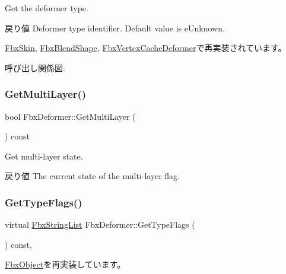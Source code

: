 Get the deformer type. \begin{DoxyReturn}{戻り値}
Deformer type identifier. Default value is e\+Unknown. 
\end{DoxyReturn}


\hyperlink{class_fbx_skin_abaf5fca14c0e8339ea692560fbd494d8}{Fbx\+Skin}, \hyperlink{class_fbx_blend_shape_afc886286ac95264b993335d8b3954b4f}{Fbx\+Blend\+Shape}, \hyperlink{class_fbx_vertex_cache_deformer_ab213400e170fe58699649acaf652c787}{Fbx\+Vertex\+Cache\+Deformer}で再実装されています。

呼び出し関係図\+:
\mbox{\label{class_fbx_deformer_a1f56fdb78d3b615bb2b4b4d142436e8b}} 
\subsubsection{\texorpdfstring{Get\+Multi\+Layer()}{GetMultiLayer()}}
{\footnotesize\ttfamily bool Fbx\+Deformer\+::\+Get\+Multi\+Layer (\begin{DoxyParamCaption}{ }\end{DoxyParamCaption}) const}

Get multi-\/layer state. \begin{DoxyReturn}{戻り値}
The current state of the multi-\/layer flag. 
\end{DoxyReturn}
\mbox{\label{class_fbx_deformer_ac3f5a3eb2dda62397fc667004d798319}} 
\subsubsection{\texorpdfstring{Get\+Type\+Flags()}{GetTypeFlags()}}
{\footnotesize\ttfamily virtual \hyperlink{class_fbx_string_list}{Fbx\+String\+List} Fbx\+Deformer\+::\+Get\+Type\+Flags (\begin{DoxyParamCaption}{ }\end{DoxyParamCaption}) const\hspace{0.3cm}{\ttfamily [protected]}, {\ttfamily [virtual]}}



\hyperlink{class_fbx_object_a6d30a5d00400039a248977cf9f9255b2}{Fbx\+Object}を再実装しています。



